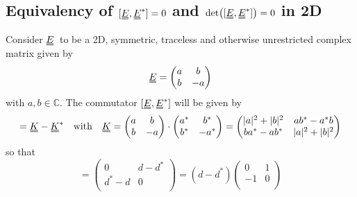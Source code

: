 \documentclass[12pt]{article}
\newcommand{\duf}[2]{\stackunder[0.5pt]{\stackunder[0.8pt]{\stackunder[1pt]{\ensuremath{#1}}{\rule{\widthof{\ensuremath{#2}}*\real{0.9}}{.1ex}}}{\rule{\widthof{\ensuremath{#2}}*\real{0.9}}{.1ex}}}{}}
\newcommand{\du}[1]{\duf{#1}{#1}}
\newcommand{\EE}{\ensuremath{\du{E}}}
\begin{document}
\begin{appendices}
    \section{Equivalency of $[\EE,\EE^*]=0$ and $\det([\EE,\EE^*])=0$ in 2D}\label{app:noruaeq}
        Consider \EE\ to be a 2D, symmetric, traceless and otherwise unrestricted complex matrix given by
        \begin{equation}
            \EE = \begin{pmatrix}
                a & b \\
                b & -a \\
            \end{pmatrix}
        \end{equation}
        with $a, b \in \mathbb{C}$.
        The commutator $[\EE,\EE^*]$ will be given by
        \begin{equation}
            [\EE,\EE^*] = \du{K} - \du{K}^* \qq{with} \du{K} = \begin{pmatrix}
                a & b \\
                b & -a \\
            \end{pmatrix} \cdot \begin{pmatrix}
                a^* & b^* \\
                b^* & -a^* \\
            \end{pmatrix} = \begin{pmatrix}
                |a|^2 + |b|^2 & ab^* - a^*b \\
                ba^* - ab^* & |a|^2 + |b|^2 \\
            \end{pmatrix}
        \end{equation}
        so that
        \begin{equation}
            [\EE,\EE^*] = \begin{pmatrix}
                0 & d - d^* \\
                d^* - d & 0 \\
            \end{pmatrix} = (d-d^*) \begin{pmatrix}
                0 & 1 \\
                -1 & 0 \\
            \end{pmatrix}
        \end{equation}

\end{appendices}
\end{document}
